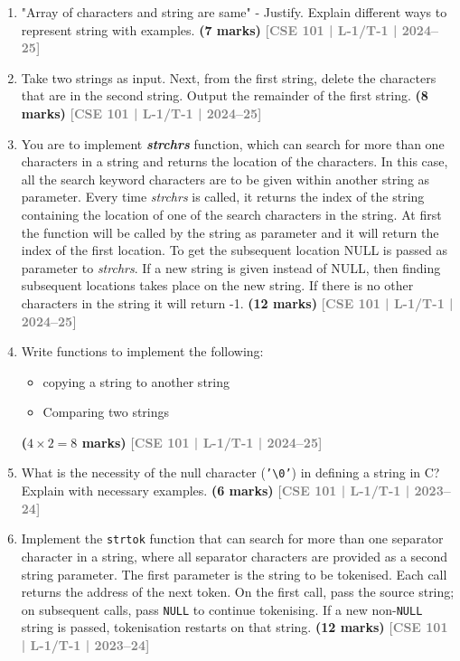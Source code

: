 \documentclass[12pt,a3paper]{article}
\newcommand{\yr}[1]{\hfill\textcolor{gray}{\small\textbf{[#1]}}}
\newcommand{\mk}[1]{\textcolor{orange!70!black}{\small\textbf{(#1 marks)}}}
\begin{document}
\begin{enumerate}

\item "Array of characters and string are same" - Justify. Explain different ways to represent string with examples.
\mk{7} \yr{CSE 101 | L-1/T-1 | 2024--25}

    \item Take two strings as input. Next, from the first string, delete the characters that are in the second string. Output the remainder of the first string.
    \mk{8} \yr{CSE 101 | L-1/T-1 | 2024--25}

    \item You are to implement \textbf{\textit{strchrs}} function, which can search for more than one characters in a string and returns the location of the characters. In this case, all the search keyword characters are to be given within another string as parameter. Every time \textit{strchrs} is called, it returns the index of the string containing the location of one of the search characters in the string. At first the function will be called by the string as parameter and it will return the index of the first location. To get the subsequent location NULL is passed as parameter to \textit{strchrs}. If a new string is given instead of NULL, then finding subsequent locations takes place on the new string. If there is no other characters in the string it will return -1.
    \mk{12} \yr{CSE 101 | L-1/T-1 | 2024--25}

    \item Write functions to implement the following:
    \begin{itemize}
        \item[(i)] copying a string to another string
        \item[(ii)] Comparing two strings
    \end{itemize}  
\mk{$4\times2=8$} \yr{CSE 101 | L-1/T-1 | 2024--25}


\item What is the necessity of the null character (\texttt{'\textbackslash 0'}) in defining a string in C? Explain with necessary examples.
\mk{6} \yr{CSE 101 | L-1/T-1 | 2023--24}

\item Implement the \texttt{strtok} function that can search for more than one separator character in a string, where all separator characters are provided as a second string parameter. The first parameter is the string to be tokenised. Each call returns the address of the next token. On the first call, pass the source string; on subsequent calls, pass \texttt{NULL} to continue tokenising. If a new non-\texttt{NULL} string is passed, tokenisation restarts on that string.
\mk{12} \yr{CSE 101 | L-1/T-1 | 2023--24}


\end{enumerate}
\end{document}
